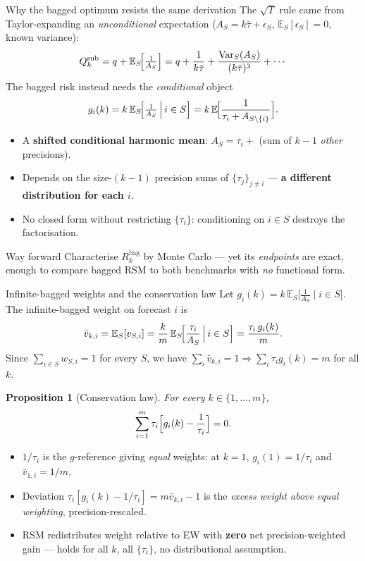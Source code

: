 \documentclass[11pt,aspectratio=169]{beamer}
\newcommand{\Qsub}{Q_k^{\mathrm{sub}}}
\newcommand{\Rk}{R_k^{\mathrm{bag}}}
\newcommand{\E}{\mathbb{E}}
\newcommand{\Var}{\mathrm{Var}}
\newtheorem{propositionX}{Proposition}
\begin{document}
\begin{frame}{Why the bagged optimum resists the same derivation}
  The $\sqrt{T}$ rule came from Taylor-expanding an \emph{unconditional}
  expectation ($A_S=k\bar\tau+\epsilon_S$, $\E_S[\epsilon_S]=0$, known variance):
  \[
    \Qsub=q+\E_S\!\Bigl[\tfrac{1}{A_S}\Bigr]
      =q+\frac{1}{k\bar\tau}+\frac{\Var_S(A_S)}{(k\bar\tau)^3}+\cdots
  \]
  The bagged risk instead needs the \emph{conditional} object
  \[
    g_i(k)=k\,\E_S\!\Bigl[\tfrac{1}{A_S}\,\Big|\,i\in S\Bigr]
      =k\,\E\!\Bigl[\frac{1}{\tau_i+A_{S\setminus\{i\}}}\Bigr].
  \]
  \footnotesize
  \begin{itemize}
    \item A \textbf{shifted conditional harmonic mean}: $A_S=\tau_i+$ (sum of
      $k-1$ \emph{other} precisions).
    \item Depends on the size-$(k-1)$ precision sums of $\{\tau_j\}_{j\ne i}$
      --- \textbf{a different distribution for each $i$}.
    \item No closed form without restricting $\{\tau_i\}$: conditioning on
      $i\in S$ destroys the factorisation.
  \end{itemize}
  \normalsize
  \begin{alertblock}{Way forward}
    Characterise $\Rk$ by Monte Carlo --- yet its \emph{endpoints} are exact,
    enough to compare bagged RSM to both benchmarks with \emph{no} functional form.
  \end{alertblock}
\end{frame}

\begin{frame}{Infinite-bagged weights and the conservation law}
  Let $g_i(k)=k\,\E_S\!\bigl[\tfrac{1}{A_S}\mid i\in S\bigr]$. The
  infinite-bagged weight on forecast $i$ is
  \[
    \bar v_{k,i}=\E_S[v_{S,i}]
      =\frac{k}{m}\,\E_S\!\Bigl[\frac{\tau_i}{A_S}\,\Big|\,i\in S\Bigr]
      =\frac{\tau_i\,g_i(k)}{m}.
  \]
  Since $\sum_{i\in S}w_{S,i}=1$ for every $S$, we have
  $\sum_i\bar v_{k,i}=1\Rightarrow\sum_i\tau_i g_i(k)=m$ for all $k$.
  \begin{propositionX}[Conservation law]
    For every $k\in\{1,\dots,m\}$,
    \[
      \sum_{i=1}^m \tau_i\Bigl[g_i(k)-\frac{1}{\tau_i}\Bigr]=0 .
    \]
  \end{propositionX}
  \footnotesize
  \begin{itemize}
    \item $1/\tau_i$ is the $g$-reference giving \emph{equal} weights:
      at $k=1$, $g_i(1)=1/\tau_i$ and $\bar v_{1,i}=1/m$.
    \item Deviation $\tau_i[g_i(k)-1/\tau_i]=m\bar v_{k,i}-1$ is the
      \emph{excess weight above equal weighting}, precision-rescaled.
    \item RSM redistributes weight relative to EW with \textbf{zero}
      net precision-weighted gain --- holds for all $k$, all $\{\tau_i\}$,
      no distributional assumption.
  \end{itemize}
\end{frame}
\end{document}
